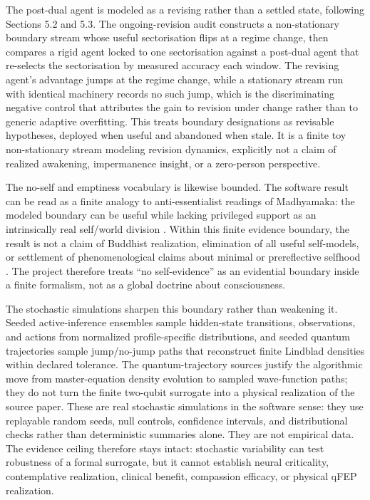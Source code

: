 \documentclass[
]{article}
\begin{document}
The post-dual agent is modeled as a revising rather than a settled
state, following Sections 5.2 and 5.3. The ongoing-revision audit
constructs a non-stationary boundary stream whose useful sectorisation
flips at a regime change, then compares a rigid agent locked to one
sectorisation against a post-dual agent that re-selects the
sectorisation by measured accuracy each window. The revising agent's
advantage jumps at the regime change, while a stationary stream run with
identical machinery records no such jump, which is the discriminating
negative control that attributes the gain to revision under change
rather than to generic adaptive overfitting. This treats boundary
designations as revisable hypotheses, deployed when useful and abandoned
when stale. It is a finite toy non-stationary stream modeling revision
dynamics, explicitly not a claim of realized awakening, impermanence
insight, or a zero-person perspective.

The no-self and emptiness vocabulary is likewise bounded. The software
result can be read as a finite analogy to anti-essentialist readings of
Madhyamaka: the modeled boundary can be useful while lacking privileged
support as an intrinsically real self/world division
\citep{siderits2013middle, westerhoff2009madhyamaka}. Within this finite
evidence boundary, the result is not a claim of Buddhist realization,
elimination of all useful self-models, or settlement of phenomenological
claims about minimal or prereflective selfhood
\citep{zahavi2005subjectivity_selfhood}. The project therefore treats
``no self-evidence'' as an evidential boundary inside a finite
formalism, not as a global doctrine about consciousness.

The stochastic simulations sharpen this boundary rather than weakening
it. Seeded active-inference ensembles sample hidden-state transitions,
observations, and actions from normalized profile-specific
distributions, and seeded quantum trajectories sample jump/no-jump paths
that reconstruct finite Lindblad densities within declared tolerance.
The quantum-trajectory sources justify the algorithmic move from
master-equation density evolution to sampled wave-function paths; they
do not turn the finite two-qubit surrogate into a physical realization
of the source paper. These are real stochastic simulations in the
software sense: they use replayable random seeds, null controls,
confidence intervals, and distributional checks rather than
deterministic summaries alone. They are not empirical data. The evidence
ceiling therefore stays intact: stochastic variability can test
robustness of a formal surrogate, but it cannot establish neural
criticality, contemplative realization, clinical benefit, compassion
efficacy, or physical qFEP realization.
\end{document}
